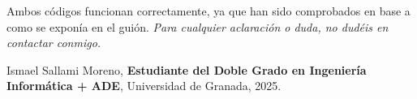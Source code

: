 \documentclass[a4paper,12pt]{article}
\begin{document}


Ambos códigos funcionan correctamente, ya que han sido comprobados en base a como se exponía en el guión. \textit{Para cualquier aclaración o duda, no dudéis en contactar conmigo.}

\newpage
\begin{thebibliography}{99}
Ismael Sallami Moreno, \textbf{Estudiante del Doble Grado en Ingeniería Informática + ADE}, Universidad de Granada, 2025.

\end{thebibliography}
\end{document}
